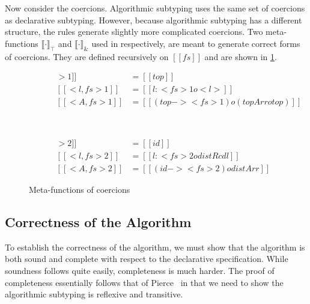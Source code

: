 Now consider the coercions. Algorithmic subtyping uses the same set of
coercions as declarative subtyping. However, because algorithmic
subtyping has a different structure, the rules generate slightly more
complicated coercions. Two meta-functions $\llbracket \cdot \rrbracket_{\top}$
and $\llbracket \cdot \rrbracket_{\&}$ used in  respectively,
are meant to generate correct forms of coercions. They are defined recursively
on $[[fs]]$ and are shown in \cref{fig:coercion}.

\begin{figure}[t]
    \centering
    \begin{small}
    \begin{subfigure}[b]{0.5\textwidth}
      \begin{align*}
        [[ < [] >1 ]] &=  [[top]] \\
        [[ < { l } , fs >1 ]] &= [[ {l : < fs >1} o < l >  ]] \\
        [[ < A , fs >1 ]] &= [[(top -> < fs >1) o (topArr o top)]]
      \end{align*}
    \end{subfigure} ~
    \begin{subfigure}[b]{0.45\textwidth}
      \begin{align*}
        [[ < [] >2 ]] &=  [[id]] \\
        [[ < { l } , fs >2 ]] &= [[ {l : < fs >2} o distRcd l  ]] \\
        [[ < A , fs >2 ]] &= [[(id -> < fs >2) o distArr]]
      \end{align*}
    \end{subfigure}
    \end{small}
    \caption{Meta-functions of coercions}\label{fig:coercion}
\end{figure}

\subsection{Correctness of the Algorithm}

To establish the correctness of the algorithm, we must show that the algorithm
is both sound and complete with respect to the declarative specification. While
soundness follows quite easily, completeness is much harder. The proof of
completeness essentially follows that of Pierce~\cite{pierce1989decision}
in that we
need to show the algorithmic subtyping is reflexive and
transitive. 


